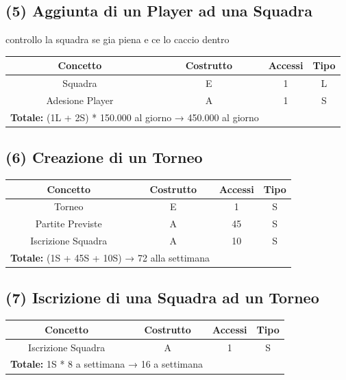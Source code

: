 \documentclass[a4paper,12pt]{report}
\begin{document}
\subsection*{(5) Aggiunta di un Player ad una Squadra}
controllo la squadra se gia piena e ce lo caccio dentro
\begin{center}
	\begin{tabular}{|c|c|c|c|}
		\hline\rowcolor{pink}
		Concetto & Costrutto & Accessi & Tipo\\
		\hline\hline		
		Squadra & E & 1 & L\\
		Adesione Player & A & 1 & S\\
		\hline
		\hline
		\multicolumn{2}{l}{%
			\textbf{Totale:} (1L + 2S) * 150.000 al giorno → 450.000 al giorno} \\
		\hline
	\end{tabular}
\end{center}
\subsection*{(6) Creazione di un Torneo}
\begin{center}
	\begin{tabular}{|c|c|c|c|}
		\hline\rowcolor{pink}
		Concetto & Costrutto & Accessi & Tipo\\
		\hline\hline		
		Torneo & E & 1 & S\\
		Partite Previste & A & 45 & S\\
		Iscrizione Squadra & A & 10 & S\\
		\hline
		\hline
		\multicolumn{2}{l}{%
			\textbf{Totale:} (1S + 45S + 10S) → 72 alla settimana} \\
		\hline
	\end{tabular}
\end{center}
\subsection*{(7) Iscrizione di una Squadra ad un Torneo}
\begin{center}
	\begin{tabular}{|c|c|c|c|}
		\hline\rowcolor{pink}
		Concetto & Costrutto & Accessi & Tipo\\
		\hline\hline		
		Iscrizione Squadra & A & 1 & S\\
		\hline
		\hline
		\multicolumn{2}{l}{%
			\textbf{Totale:}  1S * 8 a settimana → 16 a settimana} \\
		\hline
	\end{tabular}
\end{center}
\end{document}

